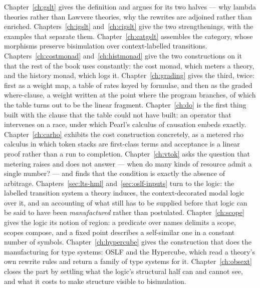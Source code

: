 Chapter~\ref{ch:gslt} gives the definition and argues for its two
halves --- why lambda theories rather than Lawvere theories, why the
rewrites are adjoined rather than enriched.
Chapters~\ref{ch:igslt} and~\ref{ch:cigslt} give the two strengthenings,
with the examples that separate them.
Chapter~\ref{ch:catgslt} assembles the category, whose morphisms preserve
bisimulation over context-labelled transitions.
Chapters~\ref{ch:costmonad} and~\ref{ch:histmonad} give the two
constructions on it that the rest of the book uses constantly: the cost
monad, which meters a theory, and the history monad, which logs it.
Chapter~\ref{ch:grading} gives the third, twice: first as a weight map, a
table of rates keyed by formulae, and then as the graded where-clause, a
weight written at the point where the program branches, of which the table
turns out to be the linear fragment.
Chapter~\ref{ch:do} is the first thing built with the clause that the table
could not have built: an operator that intervenes on a race, under which
Pearl's calculus of causation embeds exactly.
Chapter~\ref{ch:carho} exhibits the cost construction concretely, as a
metered rho calculus in which token stacks are first-class terms and
acceptance is a linear proof rather than a run to completion.
Chapter~\ref{ch:vtok} asks the question that metering raises and does not
answer --- when do many kinds of resource admit a single number? --- and
finds that the condition is exactly the absence of arbitrage.
Chapters~\ref{sec:lts-hml} and~\ref{sec:oslf-inputs} turn to the logic:
the labelled transition system a theory induces, the context-decorated
modal logic over it, and an accounting of what still has to be supplied
before that logic can be said to have been \emph{manufactured} rather
than postulated.
Chapter~\ref{ch:scope} gives the logic its notion of region: a predicate
over names delimits a scope, scopes compose, and a fixed point describes a
self-similar one in a constant number of symbols.
Chapter~\ref{ch:hypercube} gives the construction that does the
manufacturing for type systems: OSLF and the Hypercube, which read a
theory's own rewrite rules and return a family of type systems for it.
Chapter~\ref{ch:obsext} closes the part by settling what the logic's
structural half can and cannot see, and what it costs to make structure
visible to bisimulation.

